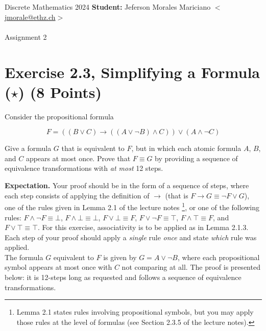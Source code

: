 \documentclass[unicode,11pt,a4paper,oneside,numbers=endperiod,openany]{scrartcl}
\begin{document}
\setassignment
{}

\serieheader
{Discrete Mathematics}
{2024}
{%
\textbf{Student:} Jeferson Morales Mariciano 
\href{mailto:jmorale@ethz.ch}{\(<\)jmorale@ethz.ch\(>\)} \\\\}
{\vspace{-1cm}}%
{Assignment 2}{}

\section*{Exercise 2.3, Simplifying a Formula (\(\star\)) \hfill (8 Points)}

Consider the propositional formula

\[
F = \left( (B \lor C) \to ((A \lor \neg B) \land C) \right) \lor (A \land \neg C)
\]

\noindent Give a formula \( G \) that is equivalent to \( F \), but in which each atomic formula \( A \), \( B \), and \( C \)
appears at most once. Prove that \( F \equiv G \) by providing a sequence of equivalence transformations 
with \textit{at most} 12 steps.

\noindent \textbf{Expectation.} 
Your proof should be in the form of a sequence of steps, where each step
consists of applying the definition of \( \to \) 
(that is \( F \to G \equiv \neg F \lor G \)), 
one of the rules given in Lemma 2.1 of the lecture notes 
\footnote{Lemma 2.1 states rules involving propositional symbols, 
but you may apply those rules at the level of formulas 
(see Section 2.3.5 of the lecture notes).}, 
or one of the following rules: 
\( F \land \neg F \equiv \bot \), 
\( F \land \bot \equiv \bot \), 
\( F \lor \bot \equiv F \), 
\( F \lor \neg F \equiv \top \), 
\( F \land \top \equiv F \), 
and \( F \lor \top \equiv \top \). 
For this exercise, associativity is to be applied as in Lemma 2.1.3. 
Each step of your proof should apply a \textit{single} rule \textit{once} 
and state \textit{which} rule was applied.
\\

The formula \( G \) equivalent to \( F \) is given by \( G = A \lor \neg B \), 
where each propositional symbol appears at most once with \( C \) not comparing at all.
The proof is presented below: 
it is 12-steps long as requested and follows a sequence of equivalence transformations.
\end{document}
